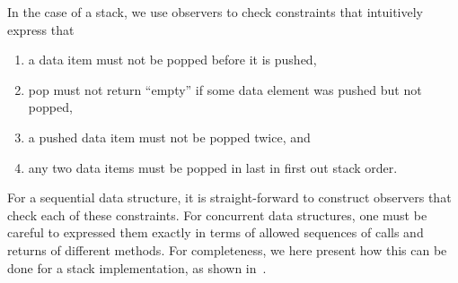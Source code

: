 In the case of a stack, we use observers to check constraints that intuitively express that
\begin{enumerate}
\item a data item must not be popped before it is pushed,
\item pop must not return ``empty'' if some data element was pushed but not
  popped,
\item a pushed data item must not be popped twice, and
\item any two data items must be popped in last in first out stack order.%
\end{enumerate}
For a sequential data structure, it is straight-forward to construct observers
that check each of these constraints.
For concurrent data structures, one must be careful to 
expressed them exactly in terms of allowed sequences of calls
and returns of different methods. For completeness, we here
present how this can be done for a stack implementation, as shown
in~\cite{BEEH:icalp15}.

